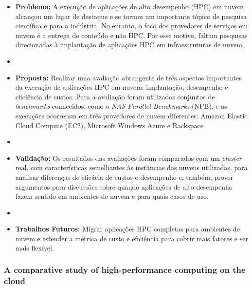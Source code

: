 \documentclass[tese,capa]{texufpel}
\begin{document}
\begin{itemize}[label={},noitemsep]
  \item \textbf{Problema:} A execução de aplicações de alto desempenho (HPC) em nuvem alcançou um lugar de destaque e se tornou um importante tópico de pesquisa científica e para a indústria. No entanto, o foco dos provedores de serviços em nuvem é a entrega de conteúdo e não HPC. Por esse motivo, faltam pesquisas direcionadas à implantação de aplicações HPC em infraestruturas de nuvem.
  \item 
  \item \textbf{Proposta:} Realizar uma avaliação abrangente de três aspectos importantes da execução de aplicações HPC em nuvem: implantação, desempenho e eficiência de custos. Para a avaliação foram utilizados conjuntos de \textit{benchmarks} conhecidos, como o \textit{NAS Parallel Benchmarks} (NPB), e as execuções ocorreram em três provedores de nuvem diferentes: Amazon Elastic Cloud Compute (EC2), Microsoft Windows Azure e Rackspace.
  \item 
  \item \textbf{Validação:} Os resultados das avaliações foram comparados com um \textit{cluster} real, com características semelhantes às instâncias das nuvens utilizadas, para analisar diferenças de eficácia de custos e desempenho e, também, prover argumentos para discussões sobre quando aplicações de alto desempenho fazem sentido em ambientes de nuvem e para quais casos de uso.
  \item 
  \item \textbf{Trabalhos Futuros:} Migrar aplicações HPC completas para ambientes de nuvem e estender a métrica de custo e eficiência para cobrir mais fatores e ser mais flexível. 
\end{itemize}

\subsubsection{A comparative study of high-performance computing on the cloud \cite{maratheComparativeStudyHighperformance2013c}}
\end{document}
